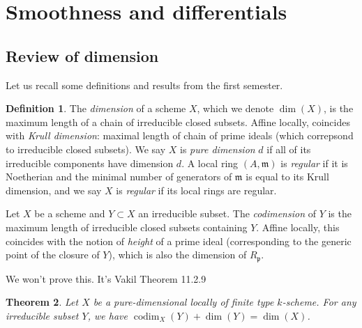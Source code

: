 \documentclass[10pt]{article}
\newtheorem{thm}{Theorem}[section]
\theoremstyle{definition}
\newtheorem{exmp}[thm]{Example}
\newtheorem{defn}[thm]{Definition}
\DeclareMathOperator{\codim}{codim}
\newcommand{\mf}{\mathfrak}
\newcommand{\todo}[1]{\textbf{\textcolor{red}{TODO #1}}}
\begin{document}
\newpage

\section{Smoothness and differentials}

\subsection{Review of dimension}

Let us recall some definitions and results from the first semester.  
\begin{defn}
The \emph{dimension} of a scheme $X$, which we denote $\dim(X)$, is the maximum length of a chain of irreducible closed subsets.  Affine locally, coincides with \emph{Krull dimension}: maximal length of chain of prime ideals (which correpsond to irreducible closed subsets).  We say $X$ is \emph{pure dimension} $d$ if all of its irreducible components have dimension $d$.  A local ring $(A, \mf{m})$ is \emph{regular} if it is Noetherian and the minimal number of generators of $\mf{m}$ is equal to its Krull dimension, and we say $X$ is \emph{regular} if its local rings are regular.

Let $X$ be a scheme and $Y \subset X$ an irreducible subset.  The \emph{codimension} of $Y$ is the maximum length of irreducible closed subsets containing $Y$.  Affine locally, this coincides with the notion of \emph{height} of a prime ideal (corresponding to the generic point of the closure of $Y$), which is also the dimension of $R_{\mf{p}}$.
\end{defn}

We won't prove this.  It's Vakil Theorem 11.2.9
\begin{thm}
Let $X$ be a pure-dimensional locally of finite type $k$-scheme.  For any irreducible subset $Y$, we have $\codim_X(Y) + \dim(Y) = \dim(X)$.
\end{thm}

%
%
\end{document}
